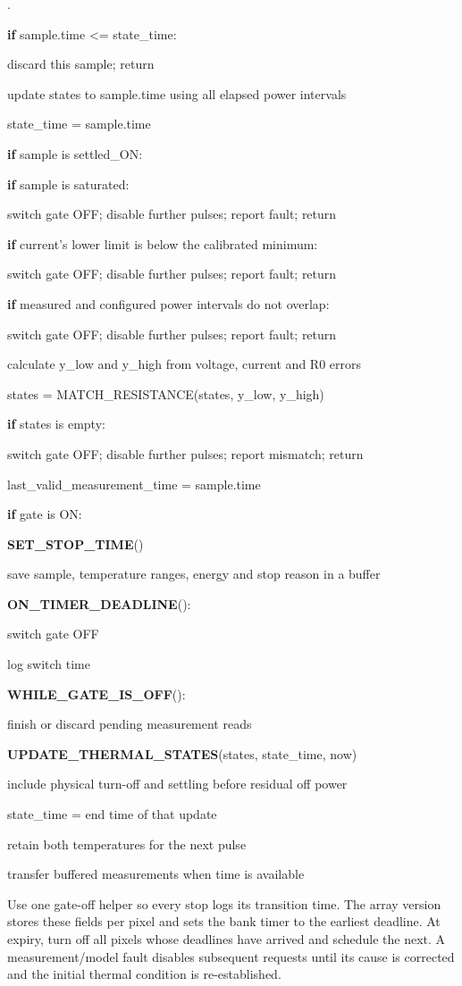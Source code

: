 \documentclass[11pt,letterpaper]{article}
\newcounter{pseudoline}
\newenvironment{pseudocode}{%
  \par\begingroup\small
  \setcounter{pseudoline}{0}
  \begin{list}{\arabic{pseudoline}.}{%
    \usecounter{pseudoline}
    \setlength{\leftmargin}{2.5em}
    \setlength{\labelwidth}{1.9em}
    \setlength{\labelsep}{0.6em}
    \setlength{\itemsep}{0.15em}
    \setlength{\parsep}{0pt}
    \setlength{\topsep}{0.35em}}%
  }{\end{list}\endgroup\par}
\newcommand{\pcstep}[2]{%
  \item \hspace*{#1em}%
  \parbox[t]{\dimexpr\linewidth-#1em\relax}{\raggedright #2\strut}}
\begin{document}
\begin{pseudocode}
\pcstep{1.0}{\textbf{if} sample.time <= state\_\allowbreak{}time:}
\pcstep{2.0}{discard this sample; return}
\pcstep{1.0}{update states to sample.time using all elapsed power intervals}
\pcstep{1.0}{state\_\allowbreak{}time = sample.time}
\pcstep{1.0}{\textbf{if} sample is settled\_\allowbreak{}ON:}
\pcstep{2.0}{\textbf{if} sample is saturated:}
\pcstep{3.0}{switch gate OFF; disable further pulses; report fault; return}
\pcstep{2.0}{\textbf{if} current's lower limit is below the calibrated minimum:}
\pcstep{3.0}{switch gate OFF; disable further pulses; report fault; return}
\pcstep{2.0}{\textbf{if} measured and configured power intervals do not overlap:}
\pcstep{3.0}{switch gate OFF; disable further pulses; report fault; return}
\pcstep{2.0}{calculate y\_\allowbreak{}low and y\_\allowbreak{}high from voltage, current and R0 errors}
\pcstep{2.0}{states = MATCH\_\allowbreak{}RESISTANCE(states, y\_\allowbreak{}low, y\_\allowbreak{}high)}
\pcstep{2.0}{\textbf{if} states is empty:}
\pcstep{3.0}{switch gate OFF; disable further pulses; report mismatch; return}
\pcstep{2.0}{last\_\allowbreak{}valid\_\allowbreak{}measurement\_\allowbreak{}time = sample.time}
\pcstep{1.0}{\textbf{if} gate is ON:}
\pcstep{2.0}{\textbf{SET\_\allowbreak{}STOP\_\allowbreak{}TIME}()}
\pcstep{1.0}{save sample, temperature ranges, energy and stop reason in a buffer}
\par\vspace{0.35em}
\pcstep{0.0}{\textbf{ON\_\allowbreak{}TIMER\_\allowbreak{}DEADLINE}():}
\pcstep{1.0}{switch gate OFF}
\pcstep{1.0}{log switch time}
\par\vspace{0.35em}
\pcstep{0.0}{\textbf{WHILE\_\allowbreak{}GATE\_\allowbreak{}IS\_\allowbreak{}OFF}():}
\pcstep{1.0}{finish or discard pending measurement reads}
\pcstep{1.0}{\textbf{UPDATE\_\allowbreak{}THERMAL\_\allowbreak{}STATES}(states, state\_\allowbreak{}time, now)}
\pcstep{2.0}{include physical turn-off and settling before residual off power}
\pcstep{1.0}{state\_\allowbreak{}time = end time of that update}
\pcstep{1.0}{retain both temperatures for the next pulse}
\pcstep{1.0}{transfer buffered measurements when time is available}
\end{pseudocode}

Use one gate-off helper so every stop logs its transition time. The array version stores these fields per pixel and sets the bank timer to the earliest deadline. At expiry, turn off all pixels whose deadlines have arrived and schedule the next. A measurement/model fault disables subsequent requests until its cause is corrected and the initial thermal condition is re-established.
\end{document}
